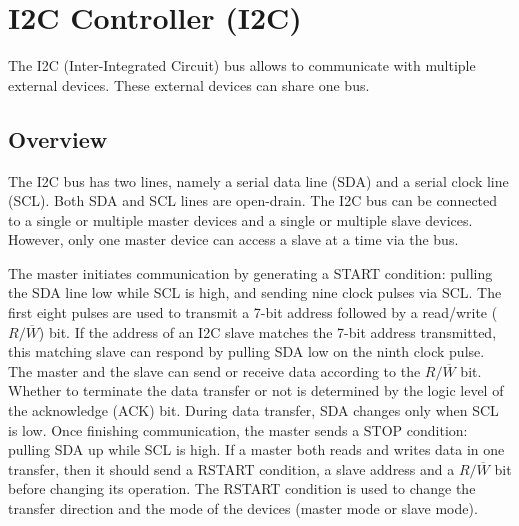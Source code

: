 \documentclass[main\_\_EN.tex]{subfiles}
\begin{document}

\ifglobal
\else
    {\let\clearpage\relax \listoftodos}
    \tableofcontents
\fi



\hypertarget{i2c}{}
\chapter{I2C Controller (I2C)}
\label{mod:i2c}



The I2C (Inter-Integrated Circuit) bus allows \chipname{} to communicate with multiple external devices. These external devices can share one bus.


\section{Overview}
The I2C bus has two lines, namely a serial data line (SDA) and a serial clock line (SCL). Both SDA and SCL lines are open-drain. The I2C bus can be connected to a single or multiple master devices and a single or multiple slave devices. However, only one master device can access a slave at a time via the bus.

The master initiates communication by generating a START condition: pulling the SDA line low while SCL is high, and sending nine clock pulses via SCL. The first eight pulses are used to transmit a 7-bit address followed by a read/write ($R/\overline W$) bit. If the address of an I2C slave matches the 7-bit address transmitted, this matching slave can respond by pulling SDA low on the ninth clock pulse. The master and the slave can send or receive data according to the $R/\overline W$ bit. Whether to terminate the data transfer or not is determined by the logic level of the acknowledge (ACK) bit. During data transfer, SDA changes only when SCL is low. Once finishing communication, the master sends a STOP condition: pulling SDA up while SCL is high. If a master both reads and writes data in one transfer, then it should send a RSTART condition, a slave address and a $R/\overline W$ bit before changing its operation. The RSTART condition is used to change the transfer direction and the mode of the devices (master mode or slave mode).
\end{document}

